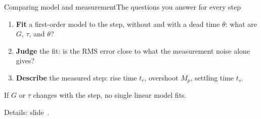 %
\begin{frame}{Comparing model and measurement}{The questions you answer for every step}
  \small
  \begin{enumerate}\setlength{\itemsep}{8pt}
    \item \textbf{Fit} a first-order model to the step, without and with a dead time $\theta$: what are $G$, $\tau$, and $\theta$?
    \item \textbf{Judge} the fit: is the RMS error close to what the measurement noise alone gives?
    \item \textbf{Describe} the measured step: rise time $t_r$, overshoot $M_p$, settling time $t_s$.
  \end{enumerate}
  \vspace{8pt}
  \alert{If $G$ or $\tau$ changes with the step, no single linear model fits.}

  \vfill
  {\footnotesize Details: slide~\pageref{app:compare}.}
\end{frame}
